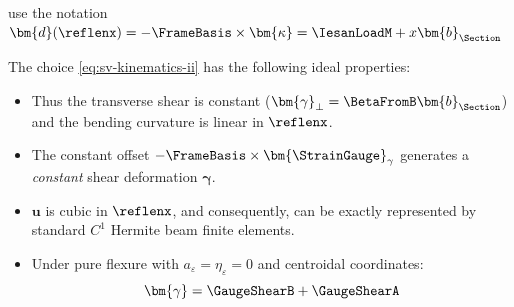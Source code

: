 \begin{Quote}
\cite{romano2012torsion} use the notation \(
\bm{d}(\reflenx) = -\FrameBasis\times\bm{\kappa} = \IesanLoadM + x\bm{b}_{\Section}
\)
\end{Quote}

\begin{remark}[Implementation]
The choice \eqref{eq:sv-kinematics-ii} has the following ideal properties:
\begin{itemize}
    \item Thus the transverse shear is constant (\(\bm{\gamma}_\perp=\BetaFromB\bm{b}_{\Section}\)) and the bending curvature is linear in \(\reflenx\).
    \item The constant offset \(-\FrameBasis\times\bm{\StrainGauge}_{\gamma}\) generates a \emph{constant} shear deformation \(\bm{\gamma}\). 
    \item \(\bm{u}\) is cubic in \(\reflenx\), and consequently, can be exactly represented by standard \(C^1\) Hermite beam finite elements.
    \item Under pure flexure with \(a_\varepsilon = \eta_\varepsilon = 0\) and centroidal coordinates: 
    \[
    \bm{\gamma} = \GaugeShearB + \GaugeShearA
    \]
\end{itemize}
\end{remark}

